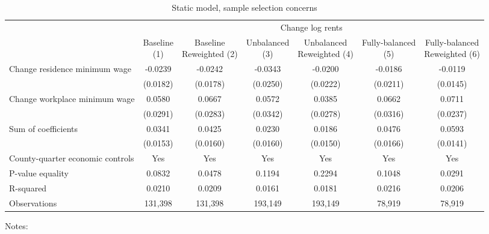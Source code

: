 \begin{table}
    \caption{Static model, sample selection concerns}
    \label{tab:static_sample}

    \begin{tabular}{@{}lcccccc@{}}
        \toprule
                                                        & \multicolumn{6}{c}{Change log rents}                                     \\ \cmidrule(l){2-7} 
                                                        & \shortsack{Baseline\\(1)}       & \shortsack{Baseline\\Reweighted (2)}
                                                        & \shortsack{Unbalanced\\(3)}     & \shortsack{Unbalanced\\Reweighted (4)}
                                                        & \shortsack{Fully-balanced\\(5)} & \shortsack{Fully-balanced\\Reweighted (6)}  \\ \midrule
        Change residence minimum wage                   & -0.0239      & -0.0242        & -0.0343       & -0.0200      & -0.0186     & -0.0119            \\
                                                        & (0.0182)    & (0.0178)      & (0.0250)     & (0.0222)    & (0.0211)   & (0.0145)          \\
        Change workplace minimum wage                   & 0.0580      & 0.0667        & 0.0572       & 0.0385      & 0.0662     & 0.0711            \\
                                                        & (0.0291)    & (0.0283)      & (0.0342)     & (0.0278)    & (0.0316)   & (0.0237)          \\ \midrule
        Sum of coefficients                             & 0.0341      & 0.0425        & 0.0230       & 0.0186      & 0.0476     &  0.0593           \\
                                                        & (0.0153)    & (0.0160)      & (0.0160)     & (0.0150)    & (0.0166)   & (0.0141)          \\ \midrule
        County-quarter economic controls                & Yes      & Yes        & Yes       & Yes      & Yes     & Yes            \\
        P-value equality                                & 0.0832      & 0.0478        & 0.1194       & 0.2294      & 0.1048     & 0.0291            \\
        R-squared                                       & 0.0210      & 0.0209        & 0.0161       & 0.0181      & 0.0216     & 0.0206            \\
        Observations                                    & 131,398     & 131,398       & 193,149      & 193,149     & 78,919    & 78,919           \\ \bottomrule
    \end{tabular}

    \begin{minipage}{.95\textwidth} \footnotesize
        \vspace{2mm}
        Notes: 
    \end{minipage}
\end{table}
